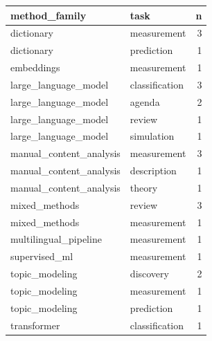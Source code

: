 \begin{tabular}{llr}
\toprule
method\_family & task & n \\
\midrule
dictionary & measurement & 3 \\
dictionary & prediction & 1 \\
embeddings & measurement & 1 \\
large\_language\_model & classification & 3 \\
large\_language\_model & agenda & 2 \\
large\_language\_model & review & 1 \\
large\_language\_model & simulation & 1 \\
manual\_content\_analysis & measurement & 3 \\
manual\_content\_analysis & description & 1 \\
manual\_content\_analysis & theory & 1 \\
mixed\_methods & review & 3 \\
mixed\_methods & measurement & 1 \\
multilingual\_pipeline & measurement & 1 \\
supervised\_ml & measurement & 1 \\
topic\_modeling & discovery & 2 \\
topic\_modeling & measurement & 1 \\
topic\_modeling & prediction & 1 \\
transformer & classification & 1 \\
\bottomrule
\end{tabular}
